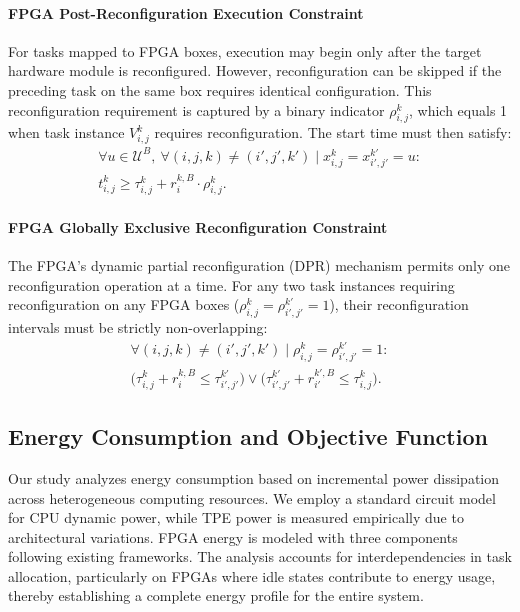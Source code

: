 \documentclass{IEEEtaes}
\begin{document}
\paragraph{FPGA Post-Reconfiguration Execution Constraint}For tasks mapped to FPGA boxes, execution may begin only after the target hardware module is reconfigured. However, reconfiguration can be skipped if the preceding task on the same box requires identical configuration. This reconfiguration requirement is captured by a binary indicator $\rho_{i,j}^k$, which equals 1 when task instance $V_{i,j}^k$ requires reconfiguration. The start time must then satisfy:
\begin{multline}
    \forall u \in \mathcal{U}^B,\ \forall (i,j,k)\ne(i',j',k') \mid x_{i,j}^{k} = x_{i',j'}^{k'} = u: \\
t_{i,j}^k \geq \tau_{i,j}^k + r_i^{k,B} \cdot \rho_{i,j}^k.
\label{equ:Computation Resource Constraints3}
\end{multline}

\paragraph{FPGA Globally Exclusive Reconfiguration Constraint}The FPGA's dynamic partial reconfiguration (DPR) mechanism permits only one reconfiguration operation at a time. For any two task instances requiring reconfiguration on any FPGA boxes ($\rho_{i,j}^k=\rho_{i',j'}^{k'}=1$), their reconfiguration intervals must be strictly non-overlapping:
\begin{multline}
    \forall (i,j,k) \neq (i',j',k') \mid \rho_{i,j}^k = \rho_{i',j'}^{k'} = 1: \\
\big( \tau_{i,j}^k + r_i^{k,B} \leq \tau_{i',j'}^{k'} \big) \vee \big( \tau_{i',j'}^{k'} + r_{i'}^{k',B} \leq \tau_{i,j}^k \big).
\label{equ:Computation Resource Constraints4}
\end{multline}

\subsection{Energy Consumption and Objective Function}
\label{subsec:problem}

Our study analyzes energy consumption based on incremental power dissipation across heterogeneous computing resources. We employ a standard circuit model for CPU dynamic power, while TPE power is measured empirically due to architectural variations. FPGA energy is modeled with three components following existing frameworks. The analysis accounts for interdependencies in task allocation, particularly on FPGAs where idle states contribute to energy usage, thereby establishing a complete energy profile for the entire system.
\end{document}
